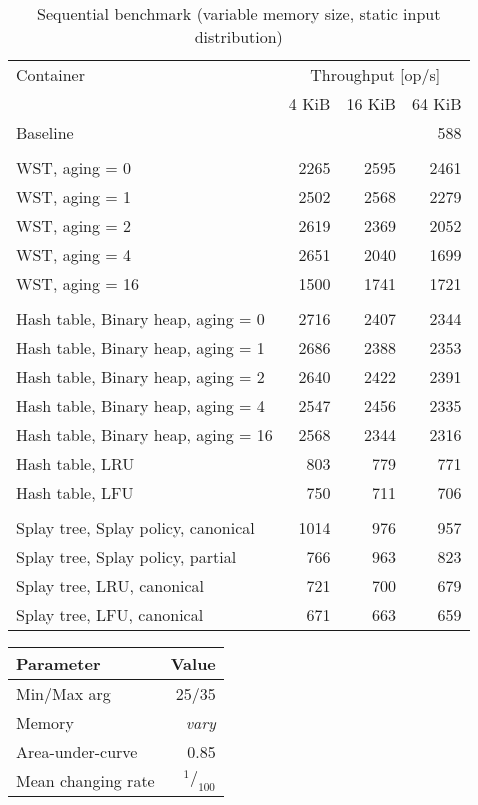 \begin{table}
\caption{Sequential benchmark (variable memory size, static input distribution)}
\begin{tabular}[b]{l  r  r  r } \toprule
Container & \multicolumn{3}{c}{Throughput [op/s]} \\ \cmidrule(r){2-4}
& 4 KiB & 16 KiB & 64 KiB \\ \midrule
Baseline & \multicolumn{3}{r}{588}  \\
\\
WST, aging = 0 & 2265 & 2595 & 2461 \\
WST, aging = 1 & 2502 & 2568 & 2279 \\
WST, aging = 2 & 2619 & 2369 & 2052 \\
WST, aging = 4 & 2651 & 2040 & 1699 \\
WST, aging = 16 & 1500 & 1741 & 1721 \\
\\
Hash table, Binary heap, aging = 0 & 2716 & 2407 & 2344 \\
Hash table, Binary heap, aging = 1 & 2686 & 2388 & 2353 \\
Hash table, Binary heap, aging = 2 & 2640 & 2422 & 2391 \\
Hash table, Binary heap, aging = 4 & 2547 & 2456 & 2335 \\
Hash table, Binary heap, aging = 16 & 2568 & 2344 & 2316 \\
Hash table, LRU & 803 & 779 & 771 \\
Hash table, LFU & 750 & 711 & 706 \\
\\
Splay tree, Splay policy, canonical & 1014 & 976 & 957 \\
Splay tree, Splay policy, partial & 766 & 963 & 823 \\
Splay tree, LRU, canonical & 721 & 700 & 679 \\
Splay tree, LFU, canonical & 671 & 663 & 659 \\
\bottomrule
\end{tabular}
\end{table}


\pagebreak

\begin{tabular}[h]{l r} \toprule
Parameter & Value \\ \midrule
Min/Max arg & 25/35 \\
Memory & \emph{vary} \\
Area-under-curve & 0.85 \\
Mean changing rate & $^1/_{100}$ \\ \bottomrule
\end{tabular}

